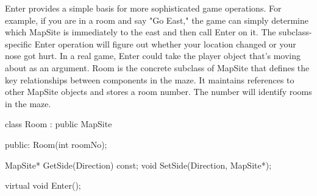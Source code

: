 \documentclass{report}
\begin{document}
\begin{itemize}
            \bigbreak \noindent 
            Enter provides a simple basis for more sophisticated game operations. For example, if you are in a room and say "Go East," the game can simply determine which MapSite is immediately to the east and then call Enter on it. The subclass-specific Enter operation will figure out whether your location changed or your nose got hurt. In a real game, Enter could take the player object that's moving about as an argument.
            \bigbreak \noindent 
            Room is the concrete subclass of MapSite that defines the key relationships between components in the maze. It maintains references to other MapSite objects and stores a room number. The number will identify rooms in the maze.
            \bigbreak \noindent 
            \begin{cppcode}
                class Room : public MapSite {
                public: 
                    Room(int roomNo);

                    MapSite* GetSide(Direction) const;
                    void SetSide(Direction, MapSite*);

                    virtual void Enter();

}
\end{cppcode}
\end{itemize}
\end{document}
